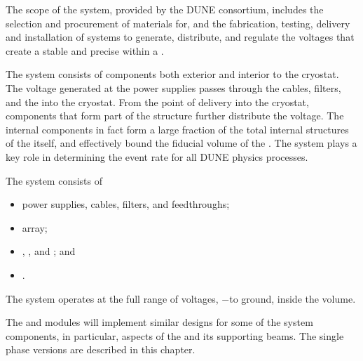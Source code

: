 
The scope of the \single {} system, provided by the DUNE  consortium, includes the selection and procurement of materials for, and the fabrication, testing, delivery and installation of systems to generate, distribute, and regulate the voltages that
create a stable and precise \efield{} within a . 

The  system consists of components both exterior and interior to the cryostat. The voltage generated at the  power supplies passes through the cables, filters, and the  \fdth into the cryostat. From the point of delivery into the cryostat, components that form part of the  structure further distribute the voltage. The internal  components in fact form a large fraction of the total internal structures of the  itself, and  
 effectively bound the  fiducial volume of the %
 . The  system plays a key role in determining the event rate for all DUNE physics processes.

The  system consists of
\begin{itemize}
\item {} power supplies, cables, filters, and feedthroughs;
\item {} array;
\item {}, , and ; and
\item {}.
\end{itemize}


The system operates at the full range of voltages, %
$-$\sptargetdriftvoltpos to ground, inside the  volume. 

The \single and \dual modules will implement similar designs for some
 of the  system components, %
 in particular, aspects of the  and its supporting beams. The single phase versions are described in this chapter. 
 
